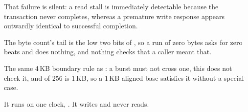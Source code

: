 That failure is silent: a read stall is immediately detectable because
the transaction never completes, whereas a premature write response
appears outwardly identical to successful completion.


The byte count's tail is the low two bits of , so a run
of zero bytes asks for zero beats and does nothing, and nothing
checks that a caller meant that.

The same 4\,KB boundary rule as : a burst must not
cross one, this does not check it, and  of 256 is
1\,KB, so a 1\,KB aligned base satisfies it without a special case.

It runs on one clock, . It writes and never reads.
